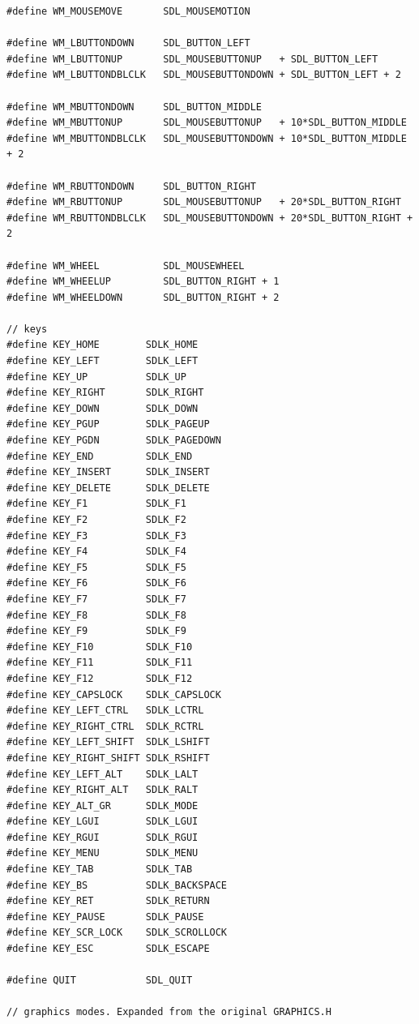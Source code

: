 \documentclass[a4paper,12pt]{article}
\begin{document}
\begin{footnotesize}
\begin{spacing}{0.8}
\begin{verbatim}
#define WM_MOUSEMOVE       SDL_MOUSEMOTION

#define WM_LBUTTONDOWN     SDL_BUTTON_LEFT
#define WM_LBUTTONUP       SDL_MOUSEBUTTONUP   + SDL_BUTTON_LEFT
#define WM_LBUTTONDBLCLK   SDL_MOUSEBUTTONDOWN + SDL_BUTTON_LEFT + 2

#define WM_MBUTTONDOWN     SDL_BUTTON_MIDDLE
#define WM_MBUTTONUP       SDL_MOUSEBUTTONUP   + 10*SDL_BUTTON_MIDDLE
#define WM_MBUTTONDBLCLK   SDL_MOUSEBUTTONDOWN + 10*SDL_BUTTON_MIDDLE + 2

#define WM_RBUTTONDOWN     SDL_BUTTON_RIGHT
#define WM_RBUTTONUP       SDL_MOUSEBUTTONUP   + 20*SDL_BUTTON_RIGHT
#define WM_RBUTTONDBLCLK   SDL_MOUSEBUTTONDOWN + 20*SDL_BUTTON_RIGHT + 2

#define WM_WHEEL           SDL_MOUSEWHEEL
#define WM_WHEELUP         SDL_BUTTON_RIGHT + 1
#define WM_WHEELDOWN       SDL_BUTTON_RIGHT + 2

// keys
#define KEY_HOME        SDLK_HOME
#define KEY_LEFT        SDLK_LEFT
#define KEY_UP          SDLK_UP
#define KEY_RIGHT       SDLK_RIGHT
#define KEY_DOWN        SDLK_DOWN
#define KEY_PGUP        SDLK_PAGEUP
#define KEY_PGDN        SDLK_PAGEDOWN
#define KEY_END         SDLK_END
#define KEY_INSERT      SDLK_INSERT
#define KEY_DELETE      SDLK_DELETE
#define KEY_F1          SDLK_F1
#define KEY_F2          SDLK_F2
#define KEY_F3          SDLK_F3
#define KEY_F4          SDLK_F4
#define KEY_F5          SDLK_F5
#define KEY_F6          SDLK_F6
#define KEY_F7          SDLK_F7
#define KEY_F8          SDLK_F8
#define KEY_F9          SDLK_F9
#define KEY_F10         SDLK_F10
#define KEY_F11         SDLK_F11
#define KEY_F12         SDLK_F12
#define KEY_CAPSLOCK    SDLK_CAPSLOCK
#define KEY_LEFT_CTRL   SDLK_LCTRL
#define KEY_RIGHT_CTRL  SDLK_RCTRL
#define KEY_LEFT_SHIFT  SDLK_LSHIFT
#define KEY_RIGHT_SHIFT SDLK_RSHIFT
#define KEY_LEFT_ALT    SDLK_LALT
#define KEY_RIGHT_ALT   SDLK_RALT
#define KEY_ALT_GR      SDLK_MODE
#define KEY_LGUI        SDLK_LGUI
#define KEY_RGUI        SDLK_RGUI
#define KEY_MENU        SDLK_MENU
#define KEY_TAB         SDLK_TAB
#define KEY_BS          SDLK_BACKSPACE
#define KEY_RET         SDLK_RETURN
#define KEY_PAUSE       SDLK_PAUSE
#define KEY_SCR_LOCK    SDLK_SCROLLOCK
#define KEY_ESC         SDLK_ESCAPE

#define QUIT            SDL_QUIT

// graphics modes. Expanded from the original GRAPHICS.H


\end{verbatim}
\end{spacing}
\end{footnotesize}
\end{document}
